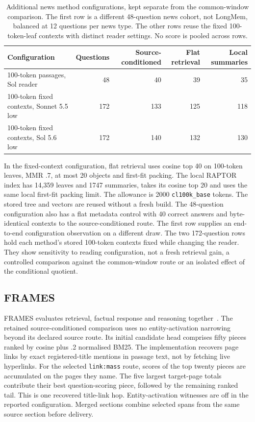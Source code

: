 \begin{table}[t]
\caption{Additional news method configurations, kept separate from the common-window comparison.
The first row is a different 48-question news cohort, not LongMem, balanced at 12 questions per news type.
The other rows reuse the fixed 100-token-leaf contexts with distinct reader settings.
No score is pooled across rows.}
\begin{ruledtabular}
\begin{tabular}{lrrrr}
Configuration & Questions & Source-conditioned & Flat retrieval & Local summaries\\
\hline
100-token passages, Sol reader &48&40&39&35\\
100-token fixed contexts, Sonnet 5.5 low &172&133&125&118\\
100-token fixed contexts, Sol 5.6 low &172&140&132&130\\
\end{tabular}
\end{ruledtabular}
\end{table}
In the fixed-context configuration, flat retrieval uses cosine top 40 on 100-token leaves, MMR .7, at most 20 objects and first-fit packing.
The local RAPTOR index has 14,359 leaves and 1747 summaries, takes its cosine top 20 and uses the same local first-fit packing limit.
The allowance is 2000 \texttt{cl100k\_base} tokens.
The stored tree and vectors are reused without a fresh build.
The 48-question configuration also has a flat metadata control with 40 correct answers and byte-identical contexts to the source-conditioned route.
The first row supplies an end-to-end configuration observation on a different draw.
The two 172-question rows hold each method's stored 100-token contexts fixed while changing the reader.
They show sensitivity to reading configuration, not a fresh retrieval gain, a controlled comparison against the common-window route or an isolated effect of the conditional quotient.

\subsection{FRAMES}
FRAMES evaluates retrieval, factual response and reasoning together~\cite{frames}.
The retained source-conditioned comparison uses no entity-activation narrowing beyond its declared source route.
Its initial candidate head comprises fifty pieces ranked by cosine plus .2 normalised BM25.
The implementation recovers page links by exact registered-title mentions in passage text, not by fetching live hyperlinks.
For the selected \texttt{link:mass} route, scores of the top twenty pieces are accumulated on the pages they name.
The five largest target-page totals contribute their best question-scoring piece, followed by the remaining ranked tail.
This is one recovered title-link hop.
Entity-activation witnesses are off in the reported configuration.
Merged sections combine selected spans from the same source section before delivery.

